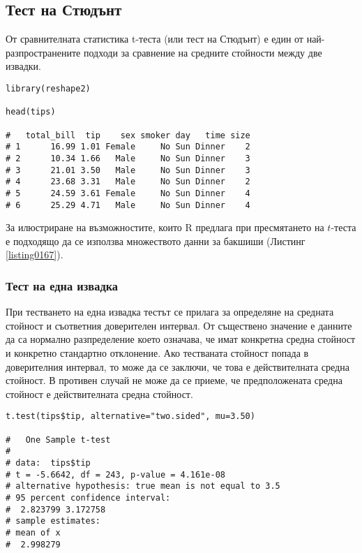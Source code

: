 \subsection{Тест на Стюдънт}

От сравнителната статистика t-теста (или тест на Стюдънт) е един от най-разпространените подходи за сравнение на средните стойности между две извадки. 

\begin{lstlisting}[caption=Тестово множество за бакшиши, label=listing0167]
library(reshape2)

head(tips)

#   total_bill  tip    sex smoker day   time size
# 1      16.99 1.01 Female     No Sun Dinner    2
# 2      10.34 1.66   Male     No Sun Dinner    3
# 3      21.01 3.50   Male     No Sun Dinner    3
# 4      23.68 3.31   Male     No Sun Dinner    2
# 5      24.59 3.61 Female     No Sun Dinner    4
# 6      25.29 4.71   Male     No Sun Dinner    4
\end{lstlisting}

За илюстриране на възможностите, които R предлага при пресмятането на $t$-теста е подходящо да се използва множеството данни за бакшиши (Листинг \ref{listing0167}).

\subsubsection{Тест на една извадка}

При тестването на една извадка тестът се прилага за определяне на средната стойност и съответния доверителен интервал. От съществено значение е данните да са нормално разпределение което означава, че имат конкретна средна стойност и конкретно стандартно отклонение. Ако тестваната стойност попада в доверителния интервал, то може да се заключи, че това е действителната средна стойност. В противен случай не може да се приеме, че предположената средна стойност е действителната средна стойност. 

\begin{lstlisting}[caption=Тест на единична извадка, label=listing0168]
t.test(tips$tip, alternative="two.sided", mu=3.50)

# 	One Sample t-test
# 
# data:  tips$tip
# t = -5.6642, df = 243, p-value = 4.161e-08
# alternative hypothesis: true mean is not equal to 3.5
# 95 percent confidence interval:
#  2.823799 3.172758
# sample estimates:
# mean of x 
#  2.998279 
\end{lstlisting}

